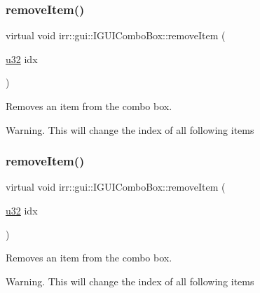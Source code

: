 \subsubsection{\texorpdfstring{remove\+Item()}{removeItem()}\hspace{0.1cm}{\footnotesize\ttfamily [1/2]}}
{\footnotesize\ttfamily virtual void irr\+::gui\+::\+I\+G\+U\+I\+Combo\+Box\+::remove\+Item (\begin{DoxyParamCaption}\item[{\hyperlink{namespaceirr_a0416a53257075833e7002efd0a18e804}{u32}}]{idx }\end{DoxyParamCaption})\hspace{0.3cm}{\ttfamily [pure virtual]}}



Removes an item from the combo box. 

Warning. This will change the index of all following items \mbox{\label{classirr_1_1gui_1_1IGUIComboBox_aa6a351f80aa57374459a9d66f416ce3c}} 
\subsubsection{\texorpdfstring{remove\+Item()}{removeItem()}\hspace{0.1cm}{\footnotesize\ttfamily [2/2]}}
{\footnotesize\ttfamily virtual void irr\+::gui\+::\+I\+G\+U\+I\+Combo\+Box\+::remove\+Item (\begin{DoxyParamCaption}\item[{\hyperlink{namespaceirr_a0416a53257075833e7002efd0a18e804}{u32}}]{idx }\end{DoxyParamCaption})\hspace{0.3cm}{\ttfamily [pure virtual]}}



Removes an item from the combo box. 

Warning. This will change the index of all following items \mbox{\label{classirr_1_1gui_1_1IGUIComboBox_a902681b9cfc783d29270f919ab3e71d8}} 
